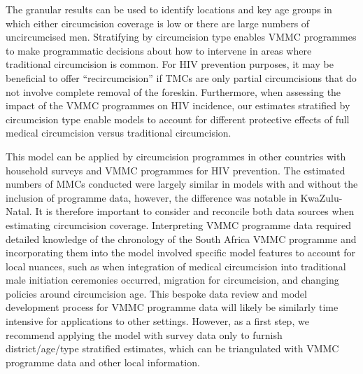 \documentclass{article}
\begin{document}
The granular results can be used to identify locations and key age groups in which either circumcision coverage is low or there are large numbers of uncircumcised men. Stratifying by circumcision type enables VMMC programmes to make programmatic decisions about how to intervene in areas where traditional circumcision is common. For HIV prevention purposes, it may be beneficial to offer ``recircumcision'' if TMCs are only partial circumcisions that do not involve complete removal of the foreskin. Furthermore, when assessing the impact of the VMMC programmes on HIV incidence, our estimates stratified by circumcision type enable models to account for different protective effects of full medical circumcision versus traditional circumcision.

This model can be applied by circumcision programmes in other countries with household surveys and VMMC programmes for HIV prevention. The estimated numbers of MMCs conducted were largely similar in models with and without the inclusion of programme data, however, the difference was notable in KwaZulu-Natal. It is therefore important to consider and reconcile both data sources when estimating circumcision coverage. Interpreting VMMC programme data required detailed knowledge of the chronology of the South Africa VMMC programme and incorporating them into the model involved specific model features to account for local nuances, such as when integration of medical circumcision into traditional male initiation ceremonies occurred, migration for circumcision, and changing policies around circumcision age. This bespoke data review and model development process for VMMC programme data will likely be similarly time intensive for applications to other settings. However, as a first step, we recommend applying the model with survey data only to furnish district/age/type stratified estimates, which can be triangulated with VMMC programme data and other local information. 
\end{document}
